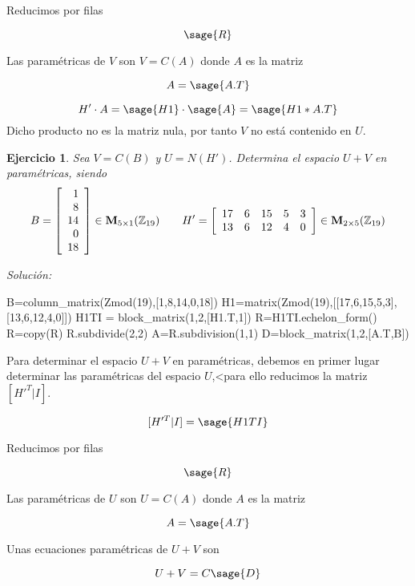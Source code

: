 \documentclass{amsart}
\newtheorem{ejer}{Ejercicio}
\begin{document}
Reducimos por filas

$$ \sage{R} $$

Las paramétricas de $V$ son $V = C(A)$ donde $A$ es la matriz

$$ A = \sage{A.T} $$


$$ H'\cdot A = \sage{H1}\cdot \sage{A} = \sage{H1*A.T} $$ Dicho producto no es 
la matriz nula, por tanto $V$ no está contenido en $U$.



\begin{ejer} Sea $V = C(B)$ y $U = N(H')$. Determina el espacio $U+V$ en param\'etricas, siendo 
\[B = \left[\begin{array}{r}
1 \\
8 \\
14 \\
0 \\
18
\end{array}\right] \in {\bf M}_{5 \times 1}({\mathbb Z}_{19}) \qquad
H' = \left[\begin{array}{rrrrr}
17 & 6 & 15 & 5 & 3 \\
13 & 6 & 12 & 4 & 0
\end{array}\right] \in {\bf M}_{2 \times 5}({\mathbb Z}_{19}) \]
\end{ejer}

{\it Soluci\'on:}

\begin{sageblock}
B=column_matrix(Zmod(19),[1,8,14,0,18])
H1=matrix(Zmod(19),[[17,6,15,5,3],[13,6,12,4,0]])
H1TI = block_matrix(1,2,[H1.T,1])
R=H1TI.echelon_form()
R=copy(R)
R.subdivide(2,2)
A=R.subdivision(1,1)
D=block_matrix(1,2,[A.T,B])
\end{sageblock}


Para determinar el espacio $U+V$ en paramétricas, debemos en primer lugar 
determinar las paramétricas del espacio $U$,<para ello reducimos la matriz 
$[H'^T|I]$.

$$ [H'^T|I] =  \sage{H1TI} $$

Reducimos por filas

$$ \sage{R} $$

Las paramétricas de $U$ son $U = C(A)$ donde $A$ es la matriz

$$ A = \sage{A.T} $$

Unas ecuaciones paramétricas de $U+V$ son 

$$ U+V = C\sage{D}  $$

\end{document}
